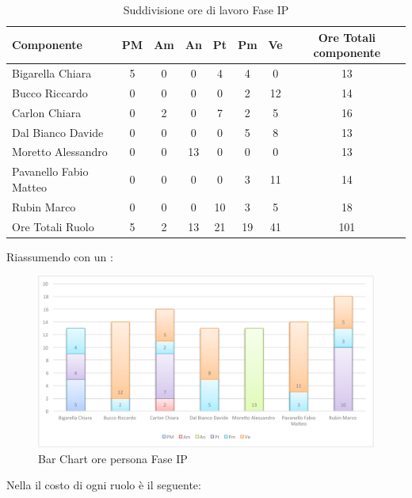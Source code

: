				\begin{table}[H]
					\begin{center}
						\begin{tabular}{| l | c | c | c | c | c | c | c |}
							\hline
							Componente 					& PM	& Am	& An 	& Pt 		& Pm 		& Ve 	& Ore Totali componente \\ \hline
							
							Bigarella Chiara 			& 5 	& 0		& 0		& 4			& 4 		& 0		& 13 \\
							Bucco Riccardo 				& 0		& 0		& 0		& 0			& 2			& 12 	& 14 \\
							Carlon Chiara	 			& 0		& 2 	& 0		& 7 		& 2 		& 5 	& 16 \\
							Dal Bianco Davide 			& 0		& 0		& 0		& 0			& 5 		& 8 	& 13 \\
							Moretto Alessandro 			& 0		& 0		& 13 	& 0			& 0			& 0		& 13 \\
							Pavanello Fabio Matteo	 	& 0		& 0		& 0		& 0			& 3 		&11 	& 14 \\
							Rubin Marco					& 0		& 0 	& 0		& 10 		& 3 		& 5		& 18 \\ \hline \hline
							
							Ore Totali Ruolo 			& 5 	& 2 	& 13 	& 21 		& 19 		& 41 	& 101\\ \hline
						\end{tabular}
					\end{center}
					\caption{Suddivisione ore di lavoro Fase IP}
				\end{table}
				Riassumendo con un :
				\begin{figure}[H]\centering
					\includegraphics[width=\textwidth]{PianoDiProgetto/Pics/ChartOreFaseIP.pdf}
					\caption{Bar Chart ore persona Fase IP}
				\end{figure}
				Nella  il costo di ogni ruolo è il seguente:
